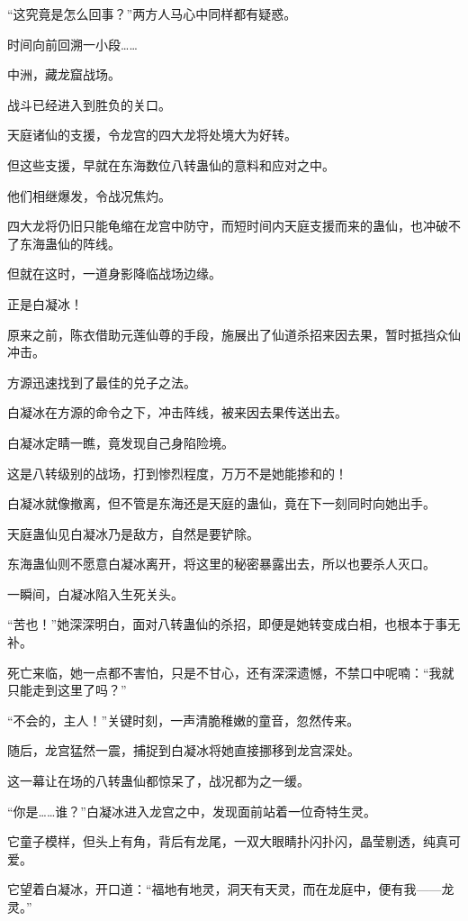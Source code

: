 \begin{this_body}
“这究竟是怎么回事？”两方人马心中同样都有疑惑。

时间向前回溯一小段……

中洲，藏龙窟战场。

战斗已经进入到胜负的关口。

天庭诸仙的支援，令龙宫的四大龙将处境大为好转。

但这些支援，早就在东海数位八转蛊仙的意料和应对之中。

他们相继爆发，令战况焦灼。

四大龙将仍旧只能龟缩在龙宫中防守，而短时间内天庭支援而来的蛊仙，也冲破不了东海蛊仙的阵线。

但就在这时，一道身影降临战场边缘。

正是白凝冰！

原来之前，陈衣借助元莲仙尊的手段，施展出了仙道杀招来因去果，暂时抵挡众仙冲击。

方源迅速找到了最佳的兑子之法。

白凝冰在方源的命令之下，冲击阵线，被来因去果传送出去。

白凝冰定睛一瞧，竟发现自己身陷险境。

这是八转级别的战场，打到惨烈程度，万万不是她能掺和的！

白凝冰就像撤离，但不管是东海还是天庭的蛊仙，竟在下一刻同时向她出手。

天庭蛊仙见白凝冰乃是敌方，自然是要铲除。

东海蛊仙则不愿意白凝冰离开，将这里的秘密暴露出去，所以也要杀人灭口。

一瞬间，白凝冰陷入生死关头。

“苦也！”她深深明白，面对八转蛊仙的杀招，即便是她转变成白相，也根本于事无补。

死亡来临，她一点都不害怕，只是不甘心，还有深深遗憾，不禁口中呢喃：“我就只能走到这里了吗？”

“不会的，主人！”关键时刻，一声清脆稚嫩的童音，忽然传来。

随后，龙宫猛然一震，捕捉到白凝冰将她直接挪移到龙宫深处。

这一幕让在场的八转蛊仙都惊呆了，战况都为之一缓。

“你是……谁？”白凝冰进入龙宫之中，发现面前站着一位奇特生灵。

它童子模样，但头上有角，背后有龙尾，一双大眼睛扑闪扑闪，晶莹剔透，纯真可爱。

它望着白凝冰，开口道：“福地有地灵，洞天有天灵，而在龙庭中，便有我——龙灵。”


\end{this_body}
